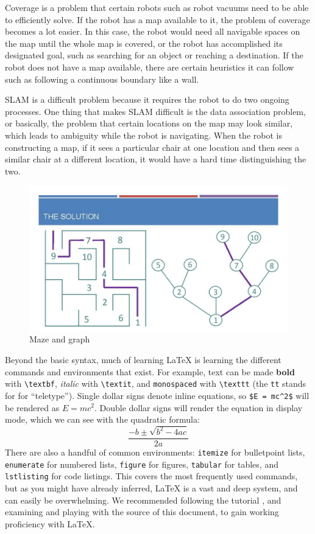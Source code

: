 \documentclass[10pt,twocolumn]{article}
\begin{document}
Coverage is a problem that certain robots such as robot vacuums need to be able to efficiently solve. If the robot has a map available to it, the problem of coverage becomes a lot easier. In this case, the robot would need all navigable spaces on the map until the whole map is covered, or the robot has accomplished its designated goal, such as searching for an object or reaching a destination. If the robot does not have a map available, there are certain heuristics it can follow such as following a continuous boundary like a wall. 

SLAM is a difficult problem because it requires the robot to do two ongoing processes. One thing that makes SLAM difficult is the data association problem, or basically, the problem that certain locations on the map may look similar, which leads to ambiguity while the robot is navigating. When the robot is constructing a map, if it sees a particular chair at one location and then sees a similar chair at a different location, it would have a hard time distinguishing the two.

\begin{figure}
    \includegraphics[width=\linewidth]{graph.jpg}
    \caption{Maze and graph}
    \label{fig1}
  \end{figure}
  
Beyond the basic syntax, much of learning LaTeX is learning the different commands and environments that exist.
For example, text can be made \textbf{bold} with \texttt{\textbackslash textbf}, \textit{italic} with \texttt{\textbackslash textit}, and \texttt{monospaced} with \texttt{\textbackslash texttt} (the \texttt{tt} stands for for ``teletype'').
Single dollar signs denote inline equations, so \texttt{\$E = mc\textasciicircum 2\$} will be rendered as $E = mc^2$.
Double dollar signs will render the equation in display mode, which we can see with the quadratic formula:
$$\frac{{-b \pm \sqrt {b^2 - 4ac} }}{{2a}}$$
There are also a handful of common environments: \texttt{itemize} for bulletpoint lists, \texttt{enumerate} for numbered lists, \texttt{figure} for figures, \texttt{tabular} for tables, and \texttt{lstlisting} for code listings.
This covers the most frequently used commands, but as you might have already inferred, LaTeX is a vast and deep system, and can easily be overwhelming.
We recommended following the  tutorial \cite{Overleaf2021LearnLaTeXIn}, and examining and playing with the source of this document, to gain working proficiency with LaTeX.
\end{document}
